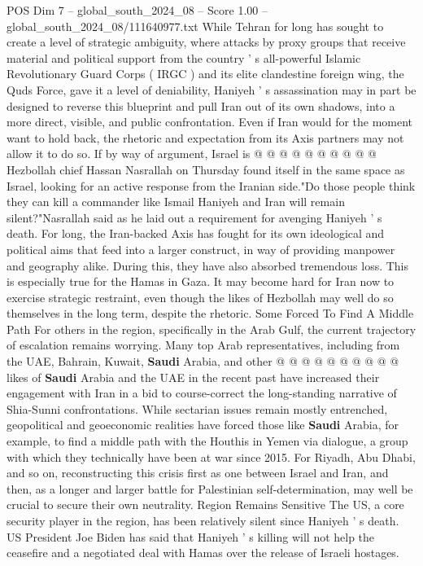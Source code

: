 \begin{textsample}{POS Dim 7 – global\_south\_2024\_08 – Score 1.00 – global\_south\_2024\_08/111640977.txt}
While Tehran for long has sought to create a level of strategic ambiguity, where attacks by proxy groups that receive material and political support from the country ' s all-powerful Islamic Revolutionary Guard Corps ( IRGC ) and its elite clandestine foreign wing, the Quds Force, gave it a level of deniability, Haniyeh ' s assassination may in part be designed to reverse this blueprint and pull Iran out of its own shadows, into a more direct, visible, and public confrontation.
Even if Iran would for the moment want to hold back, the rhetoric and expectation from its Axis partners may not allow it to do so.
If by way of argument, Israel is @ @ @ @ @ @ @ @ @ @ Hezbollah chief Hassan Nasrallah on Thursday found itself in the same space as Israel, looking for an active response from the Iranian side."Do those people think they can kill a commander like Ismail Haniyeh and Iran will remain silent?"Nasrallah said as he laid out a requirement for avenging Haniyeh ' s death.
For long, the Iran-backed Axis has fought for its own ideological and political aims that feed into a larger construct, in way of providing manpower and geography alike.
During this, they have also absorbed tremendous loss.
This is especially true for the Hamas in Gaza.
It may become hard for Iran now to exercise strategic restraint, even though the likes of Hezbollah may well do so themselves in the long term, despite the rhetoric.
Some Forced To Find A Middle Path For others in the region, specifically in the Arab Gulf, the current trajectory of escalation remains worrying.
Many top Arab representatives, including from the UAE, Bahrain, Kuwait, \textbf{Saudi} Arabia, and other @ @ @ @ @ @ @ @ @ @ likes of \textbf{Saudi} Arabia and the UAE in the recent past have increased their engagement with Iran in a bid to course-correct the long-standing narrative of Shia-Sunni confrontations.
While sectarian issues remain mostly entrenched, geopolitical and geoeconomic realities have forced those like \textbf{Saudi} Arabia, for example, to find a middle path with the Houthis in Yemen via dialogue, a group with which they technically have been at war since 2015.
For Riyadh, Abu Dhabi, and so on, reconstructing this crisis first as one between Israel and Iran, and then, as a longer and larger battle for Palestinian self-determination, may well be crucial to secure their own neutrality.
Region Remains Sensitive The US, a core security player in the region, has been relatively silent since Haniyeh ' s death.
US President Joe Biden has said that Haniyeh ' s killing will not help the ceasefire and a negotiated deal with Hamas over the release of Israeli hostages.

\end{textsample}
